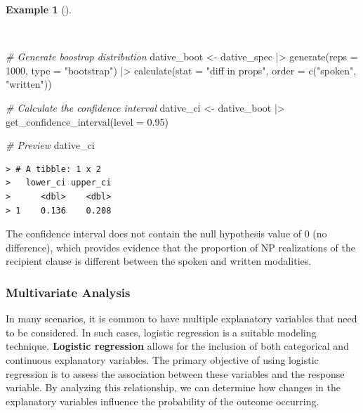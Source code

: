 \documentclass[
  letterpaper,
]{latex/krantz}
\newenvironment{Shaded}{\begin{snugshade}}{\end{snugshade}}
\newcommand{\AttributeTok}[1]{\textcolor[rgb]{0.00,0.00,0.00}{#1}}
\newcommand{\CommentTok}[1]{\textcolor[rgb]{0.00,0.00,0.00}{\textit{#1}}}
\newcommand{\DecValTok}[1]{\textcolor[rgb]{0.00,0.00,0.00}{#1}}
\newcommand{\FloatTok}[1]{\textcolor[rgb]{0.00,0.00,0.00}{#1}}
\newcommand{\FunctionTok}[1]{\textcolor[rgb]{0.00,0.00,0.00}{#1}}
\newcommand{\NormalTok}[1]{\textcolor[rgb]{0.00,0.00,0.00}{#1}}
\newcommand{\OtherTok}[1]{\textcolor[rgb]{0.00,0.00,0.00}{#1}}
\newcommand{\SpecialCharTok}[1]{\textcolor[rgb]{0.00,0.00,0.00}{#1}}
\newcommand{\StringTok}[1]{\textcolor[rgb]{0.00,0.00,0.00}{#1}}
\theoremstyle{definition}
\newtheorem{example}{Example}[chapter]
\theoremstyle{remark}
\begin{document}
\begin{example}[]\protect\hypertarget{exm-ida-cat-confidence-interval-bivariate}{}\label{exm-ida-cat-confidence-interval-bivariate}

~

\begin{Shaded}
\begin{Highlighting}[]
\CommentTok{\# Generate boostrap distribution}
\NormalTok{dative\_boot }\OtherTok{\textless{}{-}}
\NormalTok{  dative\_spec }\SpecialCharTok{|\textgreater{}}
  \FunctionTok{generate}\NormalTok{(}\AttributeTok{reps =} \DecValTok{1000}\NormalTok{, }\AttributeTok{type =} \StringTok{"bootstrap"}\NormalTok{) }\SpecialCharTok{|\textgreater{}}
  \FunctionTok{calculate}\NormalTok{(}\AttributeTok{stat =} \StringTok{"diff in props"}\NormalTok{, }\AttributeTok{order =} \FunctionTok{c}\NormalTok{(}\StringTok{"spoken"}\NormalTok{, }\StringTok{"written"}\NormalTok{))}

\CommentTok{\# Calculate the confidence interval}
\NormalTok{dative\_ci }\OtherTok{\textless{}{-}}
\NormalTok{  dative\_boot }\SpecialCharTok{|\textgreater{}}
  \FunctionTok{get\_confidence\_interval}\NormalTok{(}\AttributeTok{level =} \FloatTok{0.95}\NormalTok{)}

\CommentTok{\# Preview}
\NormalTok{dative\_ci}
\end{Highlighting}
\end{Shaded}

\begin{verbatim}
> # A tibble: 1 x 2
>   lower_ci upper_ci
>      <dbl>    <dbl>
> 1    0.136    0.208
\end{verbatim}

\end{example}

The confidence interval does not contain the null hypothesis value of 0
(no difference), which provides evidence that the proportion of NP
realizations of the recipient clause is different between the spoken and
written modalities.

\subsubsection{Multivariate Analysis}\label{multivariate-analysis}

In many scenarios, it is common to have multiple explanatory variables
that need to be considered. In such cases, logistic regression is a
suitable modeling technique. \textbf{Logistic regression} allows for the
inclusion of both categorical and continuous explanatory variables. The
primary objective of using logistic regression is to assess the
association between these variables and the response variable. By
analyzing this relationship, we can determine how changes in the
explanatory variables influence the probability of the outcome
occurring.
\end{document}
